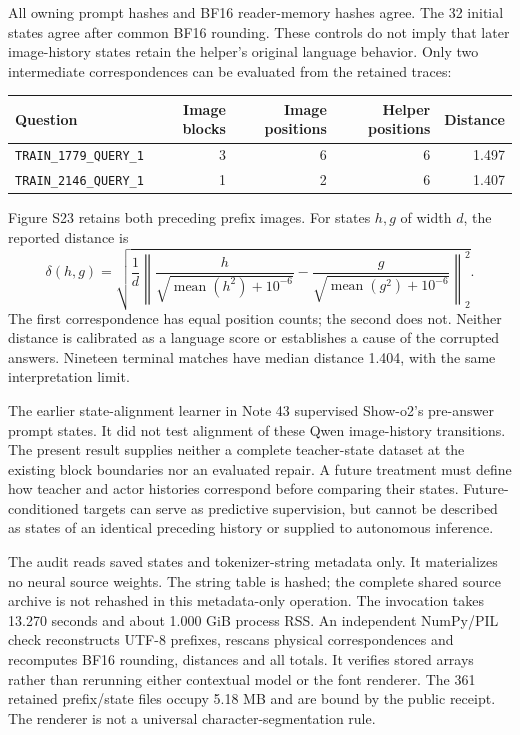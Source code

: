 \documentclass[10pt,a4paper]{article}
\begin{document}
All owning prompt hashes and BF16 reader-memory hashes agree. The 32 initial
states agree after common BF16 rounding. These controls do not imply that
later image-history states retain the helper's original language behavior.
Only two intermediate correspondences can be evaluated from the retained
traces:
\begin{center}\small
\begin{tabular}{lrrrr}
\toprule
Question & Image blocks & Image positions & Helper positions & Distance\\
\midrule
\texttt{TRAIN\_1779\_QUERY\_1} & 3 & 6 & 6 & 1.497\\
\texttt{TRAIN\_2146\_QUERY\_1} & 1 & 2 & 6 & 1.407\\
\bottomrule
\end{tabular}
\end{center}
Figure S23 retains both preceding prefix images. For states $h,g$ of width
$d$, the reported distance is
\[
 \delta(h,g)=
 \sqrt{\frac{1}{d}\left\|
 \frac{h}{\sqrt{\operatorname{mean}(h^2)+10^{-6}}}
 -
 \frac{g}{\sqrt{\operatorname{mean}(g^2)+10^{-6}}}
 \right\|_2^2}.
\]
The first correspondence has equal position counts; the second does not.
Neither distance is calibrated as a language score or establishes a cause
of the corrupted answers. Nineteen terminal matches have median distance
1.404, with the same interpretation limit.

The earlier state-alignment learner in Note 43 supervised Show-o2's
pre-answer prompt states. It did not test alignment of these Qwen
image-history transitions. The present result supplies neither a complete
teacher-state dataset at the existing block boundaries nor an evaluated
repair. A future treatment must define how teacher and actor histories
correspond before comparing their states. Future-conditioned targets can
serve as predictive supervision, but cannot be described as states of an
identical preceding history or supplied to autonomous inference.

The audit reads saved states and tokenizer-string metadata only. It
materializes no neural source weights. The string table is hashed; the
complete shared source archive is not rehashed in this metadata-only
operation. The invocation takes 13.270 seconds and about 1.000 GiB process
RSS. An independent NumPy/PIL check reconstructs UTF-8 prefixes, rescans
physical correspondences and recomputes BF16 rounding, distances and all
totals. It verifies stored arrays rather than rerunning either contextual
model or the font renderer. The 361 retained prefix/state files occupy
5.18 MB and are bound by the public receipt. The renderer is not a universal
character-segmentation rule.
\end{document}
